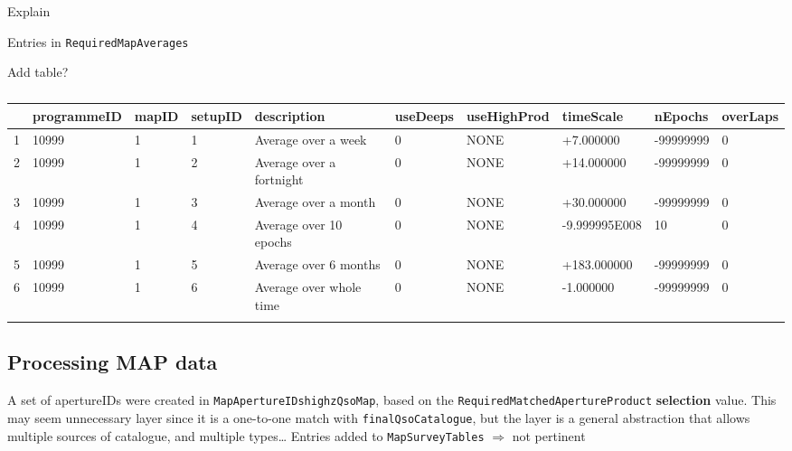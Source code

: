 \documentclass[usenatbib]{mnras}
\begin{document}
Explain

Entries in \verb+RequiredMapAverages+

Add table?
\begin{table*}
  \begin{center}
    \setlength{\tabcolsep}{4pt}
    \begin{tabular}{lll lll lll l}
\hline \hline
                &  programmeID &	mapID &	setupID  &	description               &	useDeeps  &	useHighProd &	timeScale	    &  nEpochs     &	overLaps\\
\hline
      1	& 10999	           &    1       &	1            &      Average over a week	 &     0        & 	NONE            &	+7.000000  &	-99999999 &	0\\
      2	& 10999             & 	 1	  & 2   	     & Average over a fortnight &	0        &	NONE	&+14.000000	&-99999999 &	0\\
      3	& 10999	           &    1  	 & 3	             & Average over a month	&      0        &	NONE	&+30.000000	&-99999999 &	0\\
      4	& 10999             & 	 1	 & 4	              & Average over 10 epochs &	0        &	NONE	&-9.999995E008 &	10 &	0\\
      5	& 10999             &	 1	 & 5	             & Average over 6 months   &	0        &	NONE	&+183.000000 &	-99999999 &	0\\
      6	& 10999            &	 1	 & 6	           & Average over whole time  &	0        &	NONE	&-1.000000 &	-99999999 &	0\\
      \hline \hline
      \label{tab:The_Numbers}
    \end{tabular}
    \caption{}
  \end{center}
\end{table*}


 
\subsection{Processing MAP data}

A set of apertureIDs were created in \verb+MapApertureIDshighzQsoMap+, based on
the \verb+RequiredMatchedApertureProduct+ {\bf selection} value. This may
seem unnecessary layer since it is a one-to-one match with \verb+finalQsoCatalogue+,
but the layer is a general abstraction that allows multiple sources of
catalogue, and multiple types\ldots
Entries added to \verb+MapSurveyTables+ $\Rightarrow$ not pertinent
\end{document}
